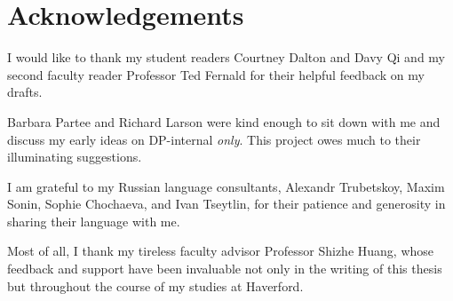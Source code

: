 \section*{Acknowledgements}
I would like to thank my student readers Courtney Dalton and Davy Qi and my second faculty reader Professor Ted Fernald for their helpful feedback on my drafts.

Barbara Partee and Richard Larson were kind enough to sit down with me and discuss my early ideas on DP-internal \textit{only}. This project owes much to their illuminating suggestions.

I am grateful to my Russian language consultants, Alexandr Trubetskoy, Maxim Sonin, Sophie Chochaeva, and Ivan Tseytlin, for their patience and generosity in sharing their language with me.

Most of all, I thank my tireless faculty advisor Professor Shizhe Huang, whose feedback and support have been invaluable not only in the writing of this thesis but throughout the course of my studies at Haverford.